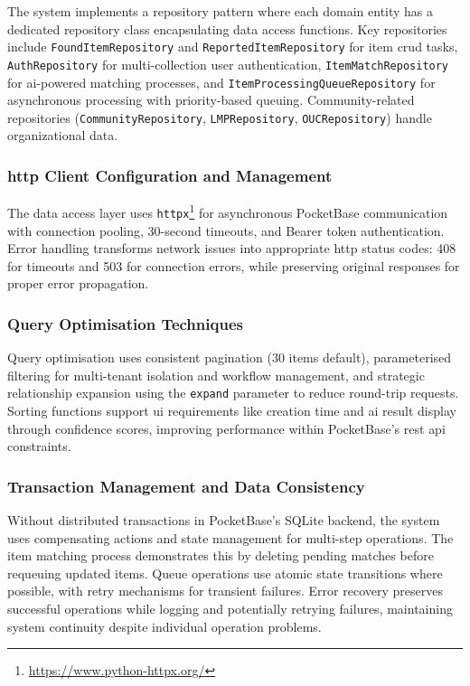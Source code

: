 The system implements a repository pattern where each domain entity has a dedicated repository class encapsulating data access functions. Key repositories include \texttt{FoundItemRepository} and \texttt{ReportedItemRepository} for item \ac{crud} tasks, \texttt{AuthRepository} for multi-collection user authentication, \texttt{ItemMatchRepository} for \ac{ai}-powered matching processes, and \texttt{ItemProcessingQueueRepository} for asynchronous processing with priority-based queuing. Community-related repositories (\texttt{CommunityRepository}, \texttt{LMPRepository}, \texttt{OUCRepository}) handle organizational data.

\subsubsection{\acs{http} Client Configuration and Management}

The data access layer uses \texttt{httpx}\footnote{\url{https://www.python-httpx.org/}} for asynchronous PocketBase communication with connection pooling, 30-second timeouts, and Bearer token authentication. Error handling transforms network issues into appropriate \ac{http} status codes: 408 for timeouts and 503 for connection errors, while preserving original responses for proper error propagation.

\subsubsection{Query Optimisation Techniques}

Query optimisation uses consistent pagination (30 items default), parameterised filtering for multi-tenant isolation and workflow management, and strategic relationship expansion using the \texttt{expand} parameter to reduce round-trip requests. Sorting functions support \ac{ui} requirements like creation time and \ac{ai} result display through confidence scores, improving performance within PocketBase's \ac{rest} \ac{api} constraints.


\subsubsection{Transaction Management and Data Consistency}

Without distributed transactions in PocketBase's SQLite backend, the system uses compensating actions and state management for multi-step operations. The item matching process demonstrates this by deleting pending matches before requeuing updated items. Queue operations use atomic state transitions where possible, with retry mechanisms for transient failures. Error recovery preserves successful operations while logging and potentially retrying failures, maintaining system continuity despite individual operation problems.

